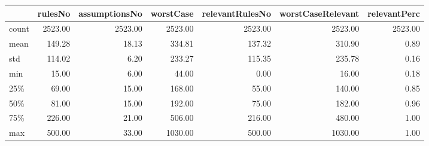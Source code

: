 \begin{tabular}{lrrrrrr}
\toprule
{} &  rulesNo &  assumptionsNo &  worstCase &  relevantRulesNo &  worstCaseRelevant &  relevantPerc \\
\midrule
count &  2523.00 &        2523.00 &    2523.00 &          2523.00 &            2523.00 &       2523.00 \\
mean  &   149.28 &          18.13 &     334.81 &           137.32 &             310.90 &          0.89 \\
std   &   114.02 &           6.20 &     233.27 &           115.35 &             235.78 &          0.16 \\
min   &    15.00 &           6.00 &      44.00 &             0.00 &              16.00 &          0.18 \\
25\%   &    69.00 &          15.00 &     168.00 &            55.00 &             140.00 &          0.85 \\
50\%   &    81.00 &          15.00 &     192.00 &            75.00 &             182.00 &          0.96 \\
75\%   &   226.00 &          21.00 &     506.00 &           216.00 &             480.00 &          1.00 \\
max   &   500.00 &          33.00 &    1030.00 &           500.00 &            1030.00 &          1.00 \\
\bottomrule
\end{tabular}
